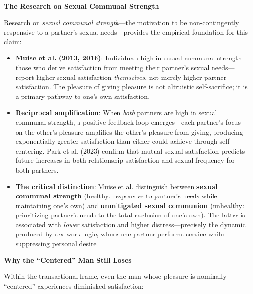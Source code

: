 \documentclass[12pt, letterpaper]{article}
\begin{document}
\textbf{The Research on Sexual Communal Strength}

Research on \textit{sexual communal strength}---the motivation to be non-contingently responsive to a partner's sexual needs---provides the empirical foundation for this claim:

\begin{itemize}
    \item \textbf{Muise et al. (2013, 2016)}: Individuals high in sexual communal strength---those who derive satisfaction from meeting their partner's sexual needs---report higher sexual satisfaction \textit{themselves}, not merely higher partner satisfaction. The pleasure of giving pleasure is not altruistic self-sacrifice; it is a primary pathway to one's own satisfaction.
    
    \item \textbf{Reciprocal amplification}: When \textit{both} partners are high in sexual communal strength, a positive feedback loop emerges---each partner's focus on the other's pleasure amplifies the other's pleasure-from-giving, producing exponentially greater satisfaction than either could achieve through self-centering. Park et al. (2023) confirm that mutual sexual satisfaction predicts future increases in both relationship satisfaction and sexual frequency for both partners.
    
    \item \textbf{The critical distinction}: Muise et al. distinguish between \textbf{sexual communal strength} (healthy: responsive to partner's needs while maintaining one's own) and \textbf{unmitigated sexual communion} (unhealthy: prioritizing partner's needs to the total exclusion of one's own). The latter is associated with \textit{lower} satisfaction and higher distress---precisely the dynamic produced by sex work logic, where one partner performs service while suppressing personal desire.
\end{itemize}

\textbf{Why the ``Centered'' Man Still Loses}

Within the transactional frame, even the man whose pleasure is nominally ``centered'' experiences diminished satisfaction:
\end{document}
